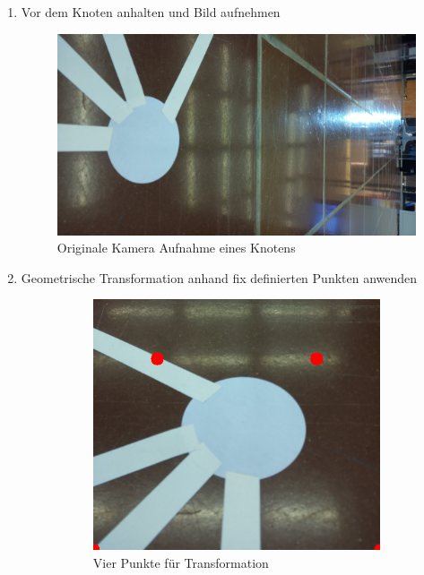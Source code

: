 \begin{enumerate}
    \item Vor dem Knoten anhalten und Bild aufnehmen
    \begin{figure}[H]
        \centering
        \includegraphics[width=0.5\linewidth, angle=90]{assets/informatik-prototyp/opencv/angle_detection/image_taken_by_pi_camer_before_node.jpg}
        \caption{Originale Kamera Aufnahme eines Knotens}
        \label{fig:before-node}
    \end{figure}
    \item Geometrische Transformation anhand fix definierten Punkten anwenden
        \begin{figure}[H]
        \centering
        \begin{subfigure}{0.4\textwidth}
        \includegraphics[width=0.95\linewidth]{assets/informatik-prototyp/opencv/angle_detection/node_before_transformation_corners.png} 
        \caption{Vier Punkte für Transformation}
        \label{fig:node-before-geometric-transform}
        \end{subfigure}
        \begin{subfigure}{0.4\textwidth}

\end{subfigure}
\end{figure}
\end{enumerate}
